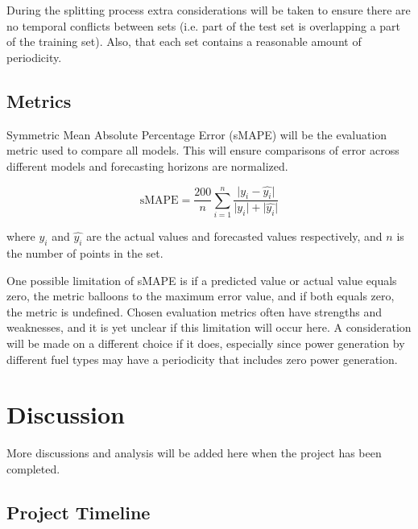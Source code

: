 \documentclass[sigconf]{acmart}
\begin{document}
During the splitting process extra considerations will be taken to ensure there are no temporal conflicts between sets (i.e. part of the test set is overlapping a part of the training set). Also, that each set contains a reasonable amount of periodicity. 

\subsection{Metrics}
Symmetric Mean Absolute Percentage Error (sMAPE) will be the evaluation metric used to compare all models. This will ensure comparisons of error across different models and forecasting horizons are normalized. 

\begin{equation}
\text{sMAPE} =\frac{200}{n}\sum_{i=1}^{n}\frac{\lvert y_i - \hat{y_i} \rvert}{\lvert y_i \rvert + \lvert \hat{y_i} \rvert}
\end{equation}

where $y_i$ and $\hat{y_i}$ are the actual values and forecasted values respectively, and $n$ is the number of points in the set.

One possible limitation of sMAPE is if a predicted value or actual value equals zero, the metric balloons to the maximum error value, and if both equals zero, the metric is undefined. Chosen evaluation metrics often have strengths and weaknesses, and it is yet unclear if this limitation will occur here. A consideration will be made on a different choice if it does, especially since power generation by different fuel types may have a periodicity that includes zero power generation.

\section{Discussion}


More discussions and analysis will be added here when the project has been completed.

\subsection{Project Timeline}
\end{document}
